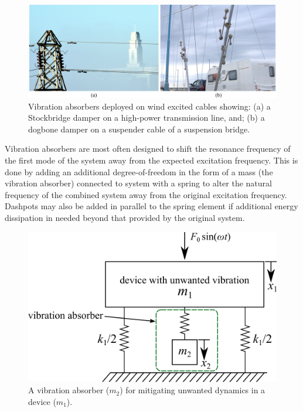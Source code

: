\documentclass[12pt,letter]{article}
\numberwithin{ex}{section} %
\numberwithin{re}{section} %
\numberwithin{vcs}{section} %
\begin{document}
\begin{figure}[H]
    \centering
    \includegraphics[width=6.5in]{../figures/vibration_absorbers}
    \caption{Vibration absorbers deployed on wind excited cables showing: (a) a Stockbridge damper on a high-power transmission line\protect\footnotemark[1], and; (b) a dogbone damper on a suspender cable of a suspension bridge\protect\footnotemark[2].}
    \label{fig:vibration_absorbers}
\end{figure}

Vibration absorbers are most often designed to shift the resonance frequency of the first mode of the system away from the expected excitation frequency. This is done by adding an additional degree-of-freedom in the form of a mass (the vibration absorber) connected to system with a spring to alter the natural frequency of the combined system away from the original excitation frequency. Dashpots may also be added in parallel to the spring element if additional energy dissipation in needed beyond that provided by the original system. 

\begin{figure}[H]
    \centering
    \includegraphics[]{../figures/vibration_absorber_spring_mass.png}
    \caption{A vibration absorber ($m_2$) for mitigating unwanted dynamics in a device ($m_1$).}
    \label{fig:vibration_absorber_spring_mass}
\end{figure}
\end{document}
